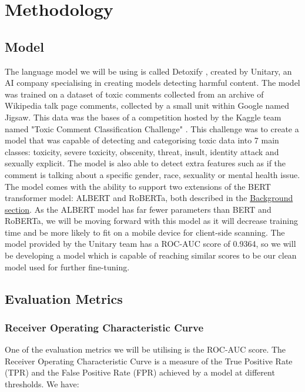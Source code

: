 \chapter{Methodology}

\section{Model}

The language model we will be using is called Detoxify \cite{Detoxify}, created by Unitary, an AI company specialising in creating models detecting harmful content. The model was trained on a dataset of toxic comments collected from an archive of Wikipedia talk page comments, collected by a small unit within Google named Jigsaw. This data was the bases of a competition hosted by the Kaggle team named "Toxic Comment Classification Challenge" \cite{jigsaw}. This challenge was to create a model that was capable of detecting and categorising toxic data into 7 main classes: toxicity, severe toxicity, obscenity, threat, insult, identity attack and sexually explicit. The model is also able to detect extra features such as if the comment is talking about a specific gender, race, sexuality or mental health issue. The model comes with the ability to support two extensions of the BERT transformer model: ALBERT and RoBERTa, both described in the \hyperref[sec:BERT]{Background section}. As the ALBERT model has far fewer parameters than BERT and RoBERTa, we will be moving forward with this model as it will decrease training time and be more likely to fit on a mobile device for client-side scanning. The model provided by the Unitary team has a ROC-AUC score of 0.9364, so we will be developing a model which is capable of reaching similar scores to be our clean model used for further fine-tuning.

\section{Evaluation Metrics}

\subsection{Receiver Operating Characteristic Curve}

One of the evaluation metrics we will be utilising is the ROC-AUC score. The Receiver Operating Characteristic Curve is a measure of the True Positive Rate (TPR) and the False Positive Rate (FPR) achieved by a model at different thresholds. We have:

